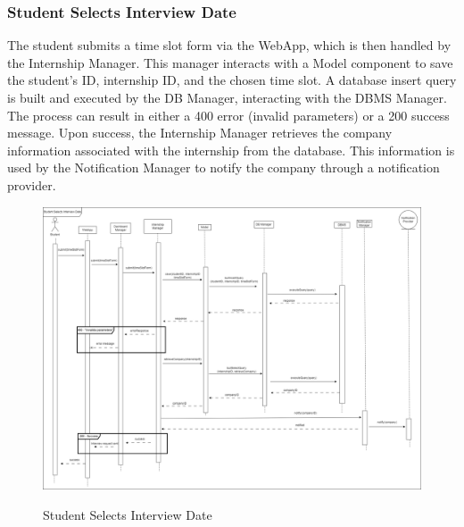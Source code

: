 \documentclass[a4paper,12pt]{article}
\begin{document}
\subsubsection*{Student Selects Interview Date}
The student submits a time slot form via the WebApp, which is then handled by the Internship Manager. This manager interacts with a Model component to save the student's ID, internship ID, and the chosen time slot. A database insert query is built and executed by the DB Manager, interacting with the DBMS Manager. The process can result in either a 400 error (invalid parameters) or a 200 success message. Upon success, the Internship Manager retrieves the company information associated with the internship from the database. This information is used by the Notification Manager to notify the company through a notification provider.
\begin{figure}[H]
\centering
\includegraphics[scale = 0.25]{DD_figures/RuntimeView/StudentSelectsInterviewDateRV.drawio.png}\\
\caption{Student Selects Interview Date}
\end{figure}

\newpage
\end{document}
